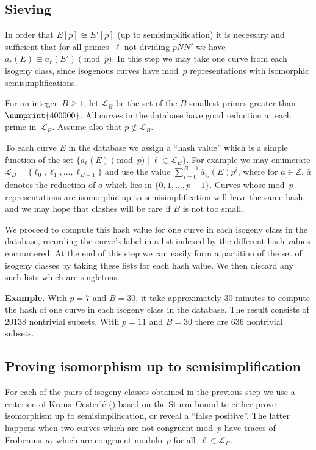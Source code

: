 \documentclass[12pt]{amsart}
\newcommand{\Z}{\mathbb{Z}}
\newcommand{\calL}{\mathcal{L}}
\numberwithin{equation}{section}
\theoremstyle{definition}
\theoremstyle{remark}
\begin{document}
\subsection{Sieving}
In order that $E[p]\cong E'[p]$ (up to semisimplification) it is
necessary and sufficient that for all primes~$\ell$ not dividing
$pNN'$ we have $a_{\ell}(E)\equiv a_{\ell}(E')\pmod{p}$.  In this step
we may take one curve from each isogeny class, since isogenous curves
have mod~$p$ representations with isomorphic semisimplifications.

For an integer~$B\ge1$, let $\calL_B$ be the set of the $B$ smallest
primes greater than $\numprint{400000}$. All curves in the database have good
reduction at each prime in~$\calL_B$. 
Assume also that
$p\notin\calL_B$.

To each curve $E$ in the database we assign a ``hash value'' which is
a simple function of the set $\{a_{\ell}(E)\pmod{p}\mid
\ell\in\calL_B\}$.  For example we may enumerate
$\calL_B=\{\ell_0,\ell_1,\dots,\ell_{B-1}\}$ and use the value
$\sum_{i=0}^{B-1}\overline{a}_{\ell_i}(E)p^i$, where for $a\in\Z$,
$\overline{a}$ denotes the reduction of $a$ which lies in
$\{0,1,\dots,p-1\}$.  Curves whose 
mod~$p$ representations are
isomorphic up to semisimplification will have the same hash, and we
may hope that clashes will be rare if $B$ is not too small.

We proceed to compute this hash value for one curve in each isogeny
class in the database, recording the curve's label in a list indexed
by the different hash values encountered.  At the end of this step we
can easily form a partition of the set of isogeny classes by taking
these lists for each hash value.  We then discard any such lists which
are singletons.

{\bf Example.} With $p=7$ and $B=30$, it take approximately 30 minutes to
compute the hash of one curve in each isogeny class in the database.
The result consists of $20138$ nontrivial subsets.  With $p=11$ and
$B=30$ there are $636$ nontrivial subsets.

\subsection{Proving isomorphism up to semisimplification}

For each of the pairs of isogeny classes obtained in the previous step
we use a criterion of Kraus--Oesterl\'e (\cite[Proposition~4]{KO})
based on the Sturm bound to either prove isomorphism up to
semisimplification, or reveal a ``false positive''.  The latter
happens when two curves which are not congruent mod~$p$ have traces of
Frobenius~$a_{\ell}$ which are congruent modulo~$p$ for
all~$\ell\in\calL_B$.
\end{document}
